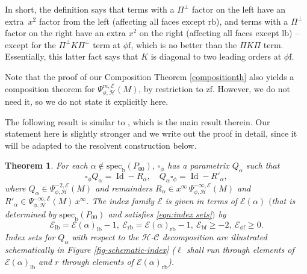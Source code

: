\documentclass[11pt]{article}
\numberwithin{equation}{section}
\theoremstyle{plain}
\newtheorem{Th}{Theorem}[section]
\theoremstyle{definition}
\newcommand{\Hmath}{{\mathscr{H}}}
\newcommand\calE{{\mathcal E}}
\newcommand{\phif}{{\phi\mathrm{f}}}
\newcommand{\lf}{{\mathrm{lb}}}
\newcommand{\rf}{{\mathrm{rb}}}
\newcommand{\bb}{{\mathrm{b}}}
\newcommand{\bbf}{{\mathrm{bf}}}
\newcommand{\zf}{{\mathrm{zf}}}
\newcommand{\specb}{\mathrm{spec}_\bb}
\DeclareMathOperator{\Id}{Id}
\newcommand{\Piperp}{\Pi^\perp}
\begin{document}
In short, the definition says that terms with a $\Piperp$ factor on the left have an extra~$x^2$ factor from the left (affecting all faces except $\rf$), and terms with a $\Piperp$ factor on the right have an extra $x^2$ on the right (affecting all faces except $\lf$) -- except for the $\Piperp K\Piperp$ term at $\phif$, which is no better than the $\Pi K\Pi$ term.
Essentially, this latter fact says that $K$ is diagonal to two leading orders at $\phif$.

Note that the proof of our Composition Theorem \ref{compositionth} also yields a composition theorem for $\Psi^{m,\calE}_{\phi,\Hmath}(M)$, by restriction to $\zf$. However, we do not need it, so we do not state it explicitly here.

The following result is similar to \cite[Th.\,12]{grieser-para}, which is the main result therein.
Our statement here is slightly stronger
and we write out the proof in detail, since it will be adapted
to the resolvent construction below.

\begin{Th}\label{thm:split phi-parametrix}
For each $\alpha \notin \specb(P_{00})$, $\square_\phi$ has a parametrix $Q_\alpha$ such that
\[
\square_\phi Q_\alpha = \Id - R_\alpha,\quad Q_\alpha\square_\phi = \Id - R'_\alpha,
\]
where $Q_\alpha\!\in\! \Psi^{-2,\calE}_{\phi, \mathscr{H}}(M)$ and remainders
$R_\alpha\!\in\! x^\infty\,\Psi^{-\infty,\calE}_{\phi, \mathscr{H}}(M)$ and $R'_\alpha\!\in\!\Psi^{-\infty,\calE}_{\phi, \mathscr{H}}(M)\,x^\infty$.
The index family $\calE$ is given in terms of $\calE(\alpha)$ $($that is determined by $\specb(P_{00})$
and satisfies \eqref{eqn:index sets}$)$ by
\[
\calE_{\lf}=\calE(\alpha)_\lf-1, \ \calE_\rf=\calE(\alpha)_\rf-1, \ \calE_\bbf\geq-2, \ \calE_{\phif}\geq 0.
\]
Index sets for $Q_\alpha$ with respect to the $\mathscr{H}$-$\mathscr{C}$ decomposition
are illustrated schematically in Figure \ref{fig-schematic-index} ($\ell$ shall run through elements of
$\calE(\alpha)_\lf$ and $r$ through elements of $\calE(\alpha)_\rf$).
\end{Th}
\end{document}

